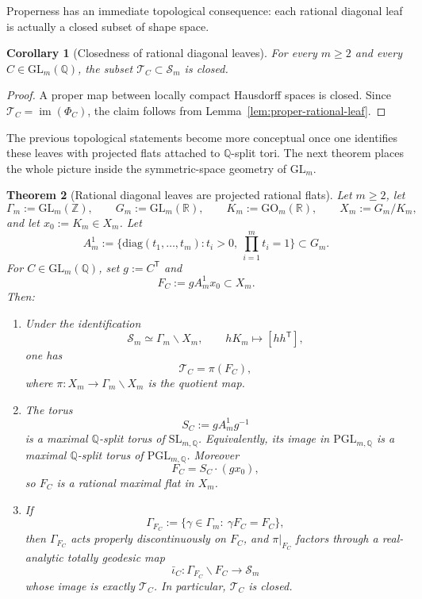 \documentclass[11pt,letterpaper]{amsart}
\newcommand{\Q}{\mathbb{Q}}
\newcommand{\Z}{\mathbb{Z}}
\newcommand{\R}{\mathbb{R}}
\newcommand{\GL}{\mathrm{GL}}
\newcommand{\GO}{\mathrm{GO}}
\newcommand{\diag}{\mathrm{diag}}
\theoremstyle{plain}
\newtheorem{theorem}{Theorem}[section]
\newtheorem{corollary}[theorem]{Corollary}
\theoremstyle{definition}
\begin{document}
Properness has an immediate topological consequence: each rational diagonal leaf is actually a closed subset of shape space.

\begin{corollary}[Closedness of rational diagonal leaves]
\label{cor:closed-rational-leaf}
For every \(m\ge 2\) and every \(C\in \GL_m(\Q)\), the subset
\(\mathcal T_C\subset \mathscr S_m\) is closed.
\end{corollary}

\begin{proof}
A proper map between locally compact Hausdorff spaces is closed.  Since
\(\mathcal T_C=\operatorname{im}(\Phi_C)\), the claim follows from
Lemma~\ref{lem:proper-rational-leaf}.
\end{proof}

The previous topological statements become more conceptual once one identifies these leaves with projected flats attached to \(\Q\)-split tori. The next theorem places the whole picture inside the symmetric-space geometry of \(\GL_m\).

\begin{theorem}[Rational diagonal leaves are projected rational flats]
\label{thm:rational-leaf-projected-flat}
Let \(m\ge 2\), let
\[
\Gamma_m:=\GL_m(\Z),\qquad
G_m:=\GL_m(\R),\qquad
K_m:=\GO_m(\R),\qquad
X_m:=G_m/K_m,
\]
and let \(x_0:=K_m\in X_m\).  Let
\[
A_m^1
:=
\{\diag(t_1,\dots,t_m): t_i>0,\ \prod_{i=1}^m t_i=1\}
\subset G_m.
\]
For \(C\in \GL_m(\Q)\), set \(g:=C^{\mathsf T}\) and
\[
F_C:=gA_m^1x_0\subset X_m.
\]
Then:
\begin{enumerate}[label=\textup{(\roman*)},leftmargin=2.8em]
\item Under the identification
\[
\mathscr S_m\simeq \Gamma_m\backslash X_m,
\qquad
hK_m\longmapsto [hh^{\mathsf T}],
\]
one has
\[
\mathcal T_C=\pi(F_C),
\]
where \(\pi:X_m\to \Gamma_m\backslash X_m\) is the quotient map.

\item
The torus
\[
S_C:=gA_m^1g^{-1}
\]
is a maximal \(\Q\)-split torus of \(\mathrm{SL}_{m,\Q}\).  Equivalently, its
image in \(\mathrm{PGL}_{m,\Q}\) is a maximal \(\Q\)-split torus of
\(\mathrm{PGL}_{m,\Q}\).  Moreover
\[
F_C=S_C\cdot (g x_0),
\]
so \(F_C\) is a rational maximal flat in \(X_m\).

\item If
\[
\Gamma_{F_C}:=\{\gamma\in \Gamma_m:\ \gamma F_C=F_C\},
\]
then \(\Gamma_{F_C}\) acts properly discontinuously on \(F_C\), and
\(\pi|_{F_C}\) factors through a real-analytic totally geodesic map
\[
\bar\iota_C:\Gamma_{F_C}\backslash F_C\longrightarrow \mathscr S_m
\]
whose image is exactly \(\mathcal T_C\). In particular, \(\mathcal T_C\) is
closed.
\end{enumerate}
\end{theorem}
\end{document}
